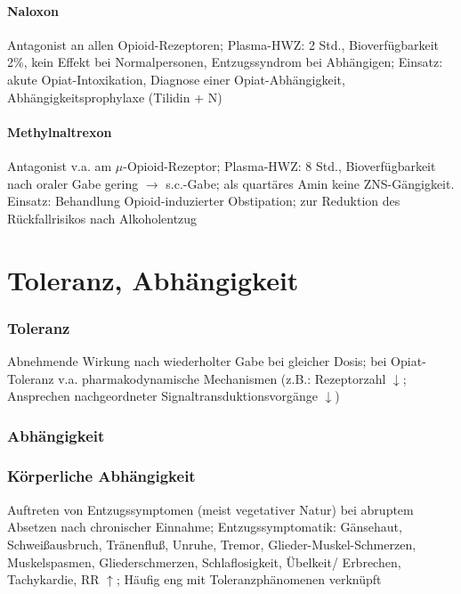 \documentclass[10pt,a4paper]{report}
\begin{document}
\paragraph{Naloxon} %
\label{subp:naloxon}
Antagonist an allen Opioid-Rezeptoren; Plasma-HWZ: 2 Std., Bioverfügbarkeit 2\%, kein Effekt bei Normalpersonen, Entzugssyndrom bei Abhängigen; Einsatz: akute Opiat-Intoxikation, Diagnose einer Opiat-Abhängigkeit, Abhängigkeitsprophylaxe (Tilidin + N) 
\paragraph{Methylnaltrexon} %
\label{subp:methylnaltrexon}
Antagonist v.a. am $\mu$-Opioid-Rezeptor; Plasma-HWZ: 8 Std., Bioverfügbarkeit nach oraler Gabe gering $\rightarrow$ s.c.-Gabe; als quartäres Amin keine ZNS-Gängigkeit. Einsatz: Behandlung Opioid-induzierter Obstipation; zur Reduktion des Rückfallrisikos nach Alkoholentzug
\section{Toleranz, Abhängigkeit} %
\label{sec:toleranz_abh_ngigkeit}
\subsubsection{Toleranz} %
\label{ssub:toleranz}
Abnehmende Wirkung nach wiederholter Gabe bei gleicher Dosis; bei Opiat-Toleranz v.a. pharmakodynamische Mechanismen (z.B.: Rezeptorzahl $\downarrow$; Ansprechen nachgeordneter Signaltransduktionsvorgänge $\downarrow$)
\subsubsection{Abhängigkeit} %
\label{ssub:abh_ngigkeit}
\subsubsection{Körperliche Abhängigkeit} %
\label{par:k_rperliche_abh_}
Auftreten von Entzugssymptomen (meist vegetativer Natur) bei abruptem Absetzen nach chronischer Einnahme; Entzugssymptomatik: Gänsehaut, Schweißausbruch, Tränenfluß, Unruhe, Tremor, Glieder-Muskel-Schmerzen, Muskelspasmen, Gliederschmerzen, Schlaflosigkeit, Übelkeit/ Erbrechen, Tachykardie, RR $\uparrow$; Häufig eng mit Toleranzphänomenen verknüpft
\end{document}
